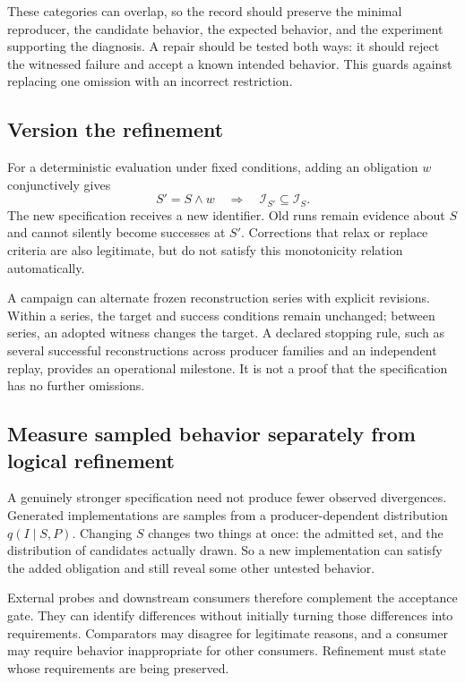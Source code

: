 \documentclass[10pt,twocolumn,letterpaper]{article}
\begin{document}
These categories can overlap, so the record should preserve the minimal reproducer, the candidate behavior, the expected behavior, and the experiment supporting the diagnosis. A repair should be tested both ways: it should reject the witnessed failure and accept a known intended behavior. This guards against replacing one omission with an incorrect restriction.

\subsection{Version the refinement}
For a deterministic evaluation under fixed conditions, adding an obligation $w$ conjunctively gives
\begin{equation}
 S'=S\land w \quad\Rightarrow\quad \mathcal{I}_{S'}\subseteq\mathcal{I}_{S}.
\end{equation}
The new specification receives a new identifier. Old runs remain evidence about $S$ and cannot silently become successes at $S'$. Corrections that relax or replace criteria are also legitimate, but do not satisfy this monotonicity relation automatically.

A campaign can alternate frozen reconstruction series with explicit revisions. Within a series, the target and success conditions remain unchanged; between series, an adopted witness changes the target. A declared stopping rule, such as several successful reconstructions across producer families and an independent replay, provides an operational milestone. It is not a proof that the specification has no further omissions.

\subsection{Measure sampled behavior separately from logical refinement}
\label{sec:sampled}
A genuinely stronger specification need not produce fewer observed divergences. Generated implementations are samples from a producer-dependent distribution $q(I\mid S,P)$. Changing $S$ changes two things at once: the admitted set, and the distribution of candidates actually drawn. So a new implementation can satisfy the added obligation and still reveal some other untested behavior.

External probes and downstream consumers therefore complement the acceptance gate. They can identify differences without initially turning those differences into requirements. Comparators may disagree for legitimate reasons, and a consumer may require behavior inappropriate for other consumers. Refinement must state whose requirements are being preserved.
\end{document}
